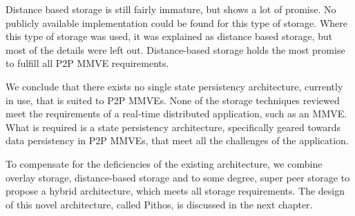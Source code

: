 Distance based storage is still fairly immature, but shows a lot of promise. No publicly available implementation could be found for this type of storage. Where this type of storage was used, it was explained as distance based storage, but most of the details were left out. Distance-based storage holds the most promise to fulfill all P2P MMVE requirements.

We conclude that there exists no single state persistency architecture, currently in use, that is suited to P2P MMVEs. None of the storage techniques reviewed meet the requirements of a real-time distributed application, such as an MMVE. What is required is a state persistency architecture, specifically geared towards data persistency in P2P MMVEs, that meet all the challenges of the application.

To compensate for the deficiencies of the existing architecture, we combine overlay storage, distance-based storage and to some degree, super peer storage to propose a hybrid architecture, which meets all storage requirements. The design of this novel architecture, called Pithos, is discussed in the next chapter.
